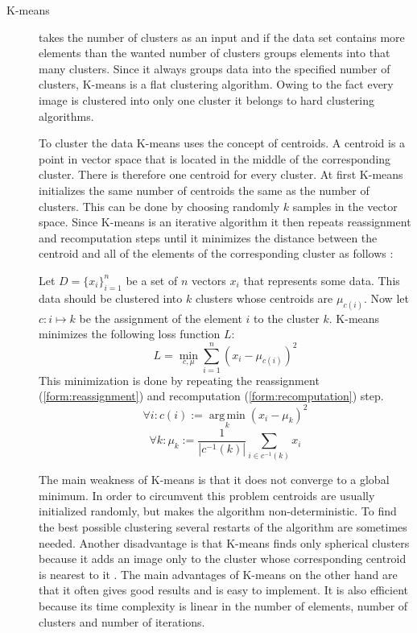 \documentclass[journal]{vgtc}       %
\begin{document}
\begin{description}
\item [K-means] takes the number of clusters as an input and if the data set contains more elements than the wanted number of clusters groups elements into that many clusters. Since it always groups data into the specified number of clusters, K-means is a flat clustering algorithm. Owing to the fact every image is clustered into only one cluster it belongs to hard clustering algorithms. 

To cluster the data K-means uses the concept of centroids. A centroid is a point in vector space that is located in the middle of the corresponding cluster. There is therefore one centroid for every cluster. 
At first K-means initializes the same number of centroids the same as the number of clusters. This can be done by choosing randomly $k$ samples  in the vector space. Since K-means is an iterative algorithm  it then repeats reassignment and recomputation steps until it minimizes the distance between the centroid and all of the elements of the corresponding cluster as follows \cite{KI17}: 

Let $D = \{x_i\}_{i=1}^n$ be a set of $n$ vectors $x_i$ that represents some data. This data should be clustered into $k$ clusters whose centroids are  $\mu_{c(i)}$. Now let $c: i \mapsto k$ be the assignment of the element $i$ to the cluster $k$. 
K-means minimizes the following loss function $L$:
\begin{equation}
\label{form: loss}
L = \min_{c, \mu} \sum_{i=1}^{n}(x_i - \mu_{c(i)})^2
\end{equation} 
This minimization is done by repeating the reassignment (\ref{form:reassignment}) and recomputation (\ref{form:recomputation}) step.
\begin{equation}
\label{form:reassignment}
\forall i: c(i) := \operatorname*{arg\,min}_k (x_i - \mu_k)^2
\end{equation}
\begin{equation}
\label{form:recomputation}
\forall k: \mu_k := \frac{1}{|c^{-1}(k)|} \sum_{i \in c^{-1}(k)} x_i
\end{equation}


The main weakness of K-means is that it does not converge to a global minimum. In order to circumvent this problem centroids are usually initialized randomly, but makes  the algorithm non-deterministic. To find the best possible clustering  several restarts of the algorithm are  sometimes needed.  Another disadvantage is that K-means finds only spherical clusters because it adds an image only to the cluster whose corresponding  centroid is nearest to it \cite{jain2010data}. The main advantages of K-means  on the other hand are that it often gives good results and is easy to implement. It is also efficient because its time complexity is linear in the number of elements, number of clusters and number of iterations. 


\end{description}
\end{document}
